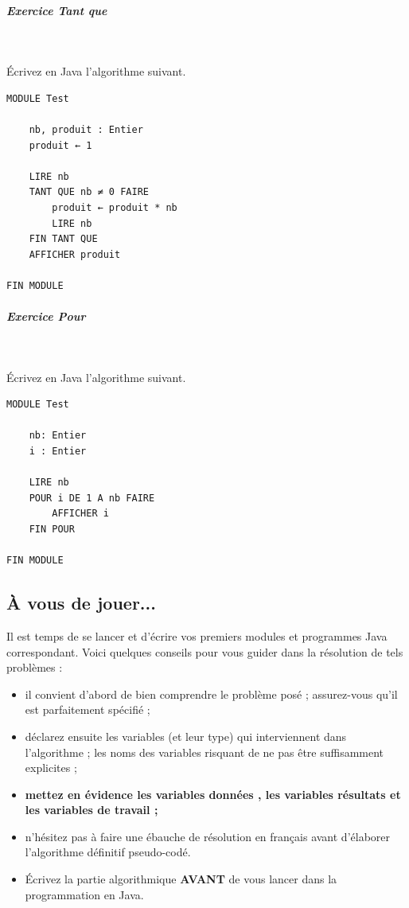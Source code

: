 \documentclass[11pt,a4paper]{article}
\begin{document}
		\subparagraph{Exercice Tant que} 
		
					\textcolor{white}{.} \par
				
					\'Ecrivez en Java l'algorithme suivant.
				
            \par
        \begin{verbatim}
MODULE Test

    nb, produit : Entier
    produit ← 1 

    LIRE nb
    TANT QUE nb ≠ 0 FAIRE
        produit ← produit * nb
        LIRE nb 
    FIN TANT QUE
    AFFICHER produit
    
FIN MODULE
			    \end{verbatim}
			
		\subparagraph{Exercice Pour} 
		
					\textcolor{white}{.} \par
				
					\'Ecrivez en Java l'algorithme suivant.
				
            \par
        \begin{verbatim}
MODULE Test

    nb: Entier
    i : Entier

    LIRE nb
    POUR i DE 1 A nb FAIRE
        AFFICHER i
    FIN POUR

FIN MODULE
			     \end{verbatim}\subsection{\`A vous de jouer...}
          Il est temps de se lancer et d'\'ecrire vos premiers modules et programmes Java correspondant. 
          Voici quelques conseils pour vous guider dans la r\'esolution de tels probl\`emes :
          
					\begin{itemize}
				
			\item il convient d'abord de bien comprendre le probl\`eme pos\'e ; assurez-vous qu'il est parfaitement sp\'ecifi\'e ;
			\item d\'eclarez ensuite les variables (et leur type) qui interviennent dans l'algorithme ; les noms des variables risquant de ne pas \^etre suffisamment explicites ;
			\item \textbf{mettez en \'evidence les variables \guillemotleft  donn\'ees \guillemotright , les variables \guillemotleft  r\'esultats \guillemotright  et les variables de travail ;}
			\item n'h\'esitez pas \`a faire une \'ebauche de r\'esolution en fran\c cais avant d'\'elaborer l'algorithme d\'efinitif pseudo-cod\'e.
			\item \'Ecrivez la partie algorithmique \textbf{AVANT} de vous lancer dans la programmation en Java.
					\end{itemize}
				
\end{document}
